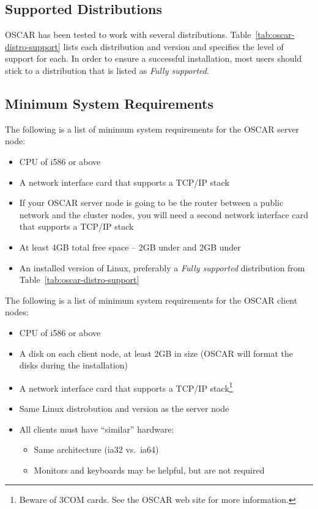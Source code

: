 \subsection{Supported Distributions}

OSCAR has been tested to work with several distributions.
Table~\ref{tab:oscar-distro-support} lists each distribution and
version and specifies the level of support for each. In order to
ensure a successful installation, most users should stick to a
distribution that is listed as \emph{Fully supported}.




\subsection{Minimum System Requirements}
\label{sec:intro-min-sys}

The following is a list of minimum system requirements for the OSCAR
server node:

\begin{itemize}
\item CPU of i586 or above
\item A network interface card that supports a TCP/IP stack
\item If your OSCAR server node is going to be the router between a
  public network and the cluster nodes, you will need a second
  network interface card that supports a TCP/IP stack
\item At least 4GB total free space -- 2GB under \file{/} and 2GB
  under 
\item An installed version of Linux, preferably a {\em Fully
    supported} distribution from Table~\ref{tab:oscar-distro-support}
\end{itemize}

The following is a list of minimum system requirements for the OSCAR
client nodes:

\begin{itemize}
\item CPU of i586 or above
\item A disk on each client node, at least 2GB in size (OSCAR will
  format the disks during the installation)
\item A network interface card that supports a TCP/IP
  stack\footnote{Beware of 3COM cards.  See the OSCAR web site for
  more information.}
\item Same Linux distrobution and version as the server node
\item All clients must have ``similar'' hardware:
  \begin{itemize}
  \item Same architecture (ia32 vs.\ ia64)
  \item Monitors and keyboards may be helpful, but are not required
  \end{itemize}
\end{itemize}

